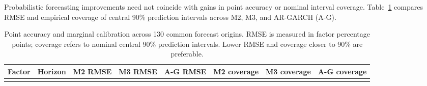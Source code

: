 \documentclass[
  12pt,
  letterpaper,
  DIV=11,
  numbers=noendperiod]{scrreprt}
\begin{document}
Probabilistic forecasting improvements need not coincide with gains in
point accuracy or nominal interval coverage.
Table~\ref{tbl-factor-auxiliary} compares RMSE and empirical coverage of
central 90\% prediction intervals across M2, M3, and AR-GARCH (A-G).

\begin{longtable}[]{@{}
  >{\raggedright\arraybackslash}p{}
  >{\raggedleft\arraybackslash}p{}
  >{\raggedleft\arraybackslash}p{}
  >{\raggedleft\arraybackslash}p{}
  >{\raggedleft\arraybackslash}p{}
  >{\raggedleft\arraybackslash}p{}
  >{\raggedleft\arraybackslash}p{}
  >{\raggedleft\arraybackslash}p{}@{}}
\caption{Point accuracy and marginal calibration across 130 common
forecast origins. RMSE is measured in factor percentage points; coverage
refers to nominal central 90\% prediction intervals. Lower RMSE and
coverage closer to 90\% are
preferable.}\label{tbl-factor-auxiliary}\tabularnewline
\toprule\noalign{}
\begin{minipage}[b]{\linewidth}\raggedright
Factor
\end{minipage} & \begin{minipage}[b]{\linewidth}\raggedleft
Horizon
\end{minipage} & \begin{minipage}[b]{\linewidth}\raggedleft
M2 RMSE
\end{minipage} & \begin{minipage}[b]{\linewidth}\raggedleft
M3 RMSE
\end{minipage} & \begin{minipage}[b]{\linewidth}\raggedleft
A-G RMSE
\end{minipage} & \begin{minipage}[b]{\linewidth}\raggedleft
M2 coverage
\end{minipage} & \begin{minipage}[b]{\linewidth}\raggedleft
M3 coverage
\end{minipage} & \begin{minipage}[b]{\linewidth}\raggedleft
A-G coverage
\end{minipage} \\
\midrule\noalign{}
\endfirsthead
\toprule\noalign{}
\begin{minipage}[b]{\linewidth}\raggedright

\end{minipage}
\end{longtable}
\end{document}
